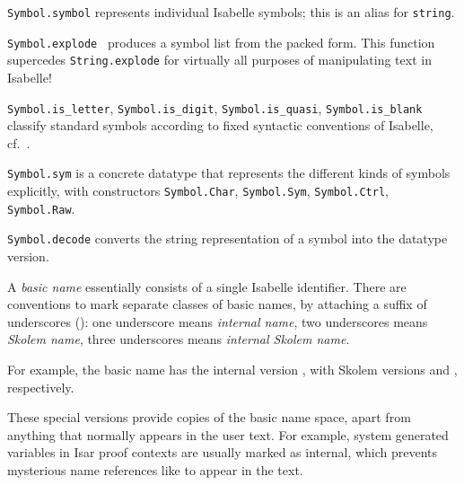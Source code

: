 \begin{isabellebody}
\begin{isamarkuptext}
  \begin{description}

  \item \verb|Symbol.symbol| represents individual Isabelle
  symbols; this is an alias for \verb|string|.

  \item \verb|Symbol.explode|~ produces a symbol list
  from the packed form.  This function supercedes \verb|String.explode| for virtually all purposes of manipulating text in
  Isabelle!

  \item \verb|Symbol.is_letter|, \verb|Symbol.is_digit|, \verb|Symbol.is_quasi|, \verb|Symbol.is_blank| classify standard
  symbols according to fixed syntactic conventions of Isabelle, cf.\
  \cite{isabelle-isar-ref}.

  \item \verb|Symbol.sym| is a concrete datatype that represents
  the different kinds of symbols explicitly, with constructors \verb|Symbol.Char|, \verb|Symbol.Sym|, \verb|Symbol.Ctrl|, \verb|Symbol.Raw|.

  \item \verb|Symbol.decode| converts the string representation of a
  symbol into the datatype version.

  \end{description}%
\end{isamarkuptext}%
\isamarkuptrue%
%
\endisatagmlref
{\isafoldmlref}%
%
\isadelimmlref
%
\endisadelimmlref
%
\isamarkuptrue%
%
\begin{isamarkuptext}%
A \emph{basic name} essentially consists of a single Isabelle
  identifier.  There are conventions to mark separate classes of basic
  names, by attaching a suffix of underscores (\isa{{\isacharunderscore}}): one
  underscore means \emph{internal name}, two underscores means
  \emph{Skolem name}, three underscores means \emph{internal Skolem
  name}.

  For example, the basic name  has the internal version
  \isa{foo{\isacharunderscore}}, with Skolem versions  and , respectively.

  These special versions provide copies of the basic name space, apart
  from anything that normally appears in the user text.  For example,
  system generated variables in Isar proof contexts are usually marked
  as internal, which prevents mysterious name references like \isa{xaa} to appear in the text.


\end{isamarkuptext}
\end{isabellebody}
